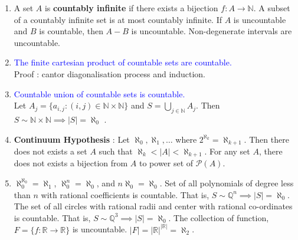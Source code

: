 \begin{enumerate}
	\item A set $A$ is \textbf{countably infinite} if there exists a bijection $f : A \to \mathbb{N}$. 
		\subitem A subset of a countably infinite set is at most countably infinite.
		\subitem If $A$ is uncountable and $B$ is countable, then $A-B$ is uncountable. 
		\subitem Non-degenerate intervals are uncountable.
	\item \textcolor{blue}{The finite cartesian product of countable sets are countable.}\\
		Proof : cantor diagonalisation process and induction.
	\item \textcolor{blue}{Countable union of countable sets is countable.}\\
		Let $A_j = \{ a_{i,j} : (i,j) \in \mathbb{N} \times \mathbb{N} \}$ and $S = \displaystyle\bigcup_{j \in \mathbb{N}} A_j$. Then $S \sim \mathbb{N} \times \mathbb{N} \implies |S| = \aleph_0$ .
	\item \textbf{Continuum Hypothesis} : Let $\aleph_0,\aleph_1,\dots$ where $2^{\aleph_k} = \aleph_{k+1}$. Then there does not exists a set $A$ such that $\aleph_k < |A| < \aleph_{k+1}$.
		\subitem For any set $A$, there does not exists a bijection from $A$ to power set of $\mathcal{P}(A)$.
	\item $\aleph_0^{\aleph_0} = \aleph_1$, $ \aleph_0^n = \aleph_0$, and $n\aleph_0 = \aleph_0$.
		\subitem Set of all polynomials of degree less than $n$ with rational coefficients is countable. That is, $S \sim \mathbb{Q}^n \implies |S| = \aleph_0$.
		\subitem The set of all circles with rational radii and center with rational co-ordinates is countable. That is, $S \sim \mathbb{Q}^3 \implies |S| = \aleph_0$.
		\subitem The collection of function, $F = \{ f : \mathbb{R} \to \mathbb{R} \}$ is uncountable. $|F| = |\mathbb{R}|^{|\mathbb{R}|} = \aleph_2$.
\end{enumerate}

